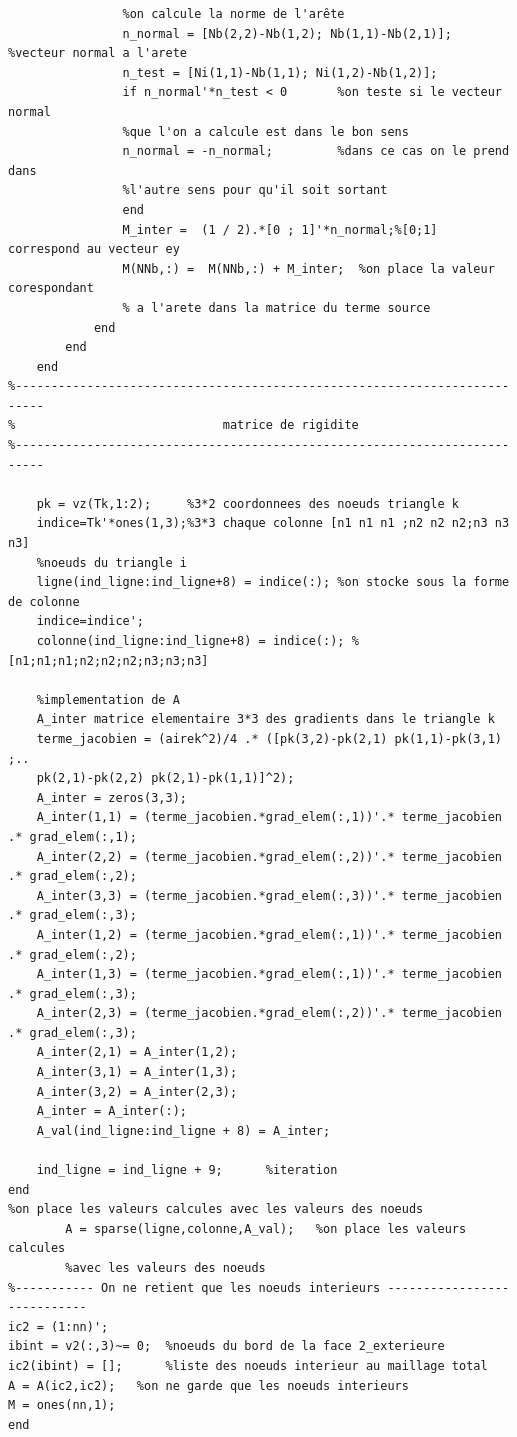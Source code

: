 \documentclass[a4paper,12pt,titlepage]{report}
\begin{document}
\begin{onehalfspace}
\begin{appendix}
\begin{verbatim}
           		%on calcule la norme de l'arête 
           		n_normal = [Nb(2,2)-Nb(1,2); Nb(1,1)-Nb(2,1)];  %vecteur normal a l'arete
            	n_test = [Ni(1,1)-Nb(1,1); Ni(1,2)-Nb(1,2)];
   	        	if n_normal'*n_test < 0       %on teste si le vecteur normal 
   	        	%que l'on a calcule est dans le bon sens
            	n_normal = -n_normal;         %dans ce cas on le prend dans 
            	%l'autre sens pour qu'il soit sortant
         		end
     			M_inter =  (1 / 2).*[0 ; 1]'*n_normal;%[0;1] correspond au vecteur ey
    			M(NNb,:) =  M(NNb,:) + M_inter;  %on place la valeur corespondant
    			% a l'arete dans la matrice du terme source 
        	end                                                              
        end
    end
%--------------------------------------------------------------------------
%                             matrice de rigidite
%--------------------------------------------------------------------------                     

	pk = vz(Tk,1:2);     %3*2 coordonnees des noeuds triangle k 
    indice=Tk'*ones(1,3);%3*3 chaque colonne [n1 n1 n1 ;n2 n2 n2;n3 n3 n3] 
    %noeuds du triangle i
    ligne(ind_ligne:ind_ligne+8) = indice(:); %on stocke sous la forme de colonne
    indice=indice';                                 
   	colonne(ind_ligne:ind_ligne+8) = indice(:); %[n1;n1;n1;n2;n2;n2;n3;n3;n3]
       
    %implementation de A
    A_inter matrice elementaire 3*3 des gradients dans le triangle k
    terme_jacobien = (airek^2)/4 .* ([pk(3,2)-pk(2,1) pk(1,1)-pk(3,1) ;..
    pk(2,1)-pk(2,2) pk(2,1)-pk(1,1)]^2);
    A_inter = zeros(3,3);
    A_inter(1,1) = (terme_jacobien.*grad_elem(:,1))'.* terme_jacobien .* grad_elem(:,1);
    A_inter(2,2) = (terme_jacobien.*grad_elem(:,2))'.* terme_jacobien .* grad_elem(:,2);
    A_inter(3,3) = (terme_jacobien.*grad_elem(:,3))'.* terme_jacobien .* grad_elem(:,3);
    A_inter(1,2) = (terme_jacobien.*grad_elem(:,1))'.* terme_jacobien .* grad_elem(:,2);
    A_inter(1,3) = (terme_jacobien.*grad_elem(:,1))'.* terme_jacobien .* grad_elem(:,3);
    A_inter(2,3) = (terme_jacobien.*grad_elem(:,2))'.* terme_jacobien .* grad_elem(:,3);
    A_inter(2,1) = A_inter(1,2); 
    A_inter(3,1) = A_inter(1,3); 
    A_inter(3,2) = A_inter(2,3);        
    A_inter = A_inter(:);
    A_val(ind_ligne:ind_ligne + 8) = A_inter;
           
    ind_ligne = ind_ligne + 9;      %iteration
end
%on place les valeurs calcules avec les valeurs des noeuds
        A = sparse(ligne,colonne,A_val);   %on place les valeurs calcules 
        %avec les valeurs des noeuds
%----------- On ne retient que les noeuds interieurs ----------------------------
ic2 = (1:nn)';  
ibint = v2(:,3)~= 0;  %noeuds du bord de la face 2_exterieure
ic2(ibint) = [];      %liste des noeuds interieur au maillage total
A = A(ic2,ic2);   %on ne garde que les noeuds interieurs
M = ones(nn,1); 
end
\end{verbatim}


\end{appendix}
\end{onehalfspace}
\end{document}
